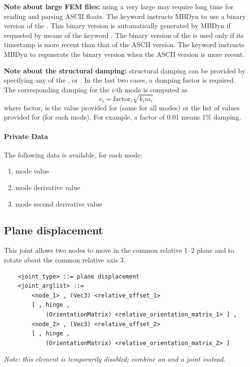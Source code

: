 \noindent
\textbf{Note about large FEM files:}
using a very large  may require long time for
reading and parsing ASCII floats.
The keyword  instructs MBDyn to use a binary version
of the .
This binary version is automatically generated by MBDyn if requested
by means of the keyword .
The binary version of the  is used only if its
timestamp is more recent than that of the ASCII version.
The keyword  instructs MBDyn to regenerate the
binary version when the ASCII version is more recent.

\noindent
\textbf{Note about the structural damping:}
structural damping can be provided by specifying any of the
,  or .
In the last two cases, a damping factor is required.
The corresponding damping for the $i$-th mode is computed as
\begin{displaymath}
	c_i = \mathrm{factor}_i \sqrt{k_i m_i}
\end{displaymath}
where $\mathrm{factor}_i$ is the value provided
for  (same for all modes) or the list 
of values provided for  (for each mode).
For example, a factor of 0.01 means 1\% damping.

\paragraph{Private Data}
The following data is available, for each mode:
\begin{enumerate}
\item {} mode  value
\item {} mode  derivative value
\item {} mode  second derivative value
\end{enumerate}




\subsection{Plane displacement}\label{sec:EL:STRUCT:JOINT:PLANE_DISPLACEMENT}
This joint allows two nodes to move in the common relative 1--2 plane 
and to rotate about the common relative axis 3.
\begin{verbatim}
    <joint_type> ::= plane displacement
    <joint_arglist> ::= 
        <node_1> , (Vec3) <relative_offset_1> 
        [ , hinge , 
            (OrientationMatrix) <relative_orientation_matrix_1> ] ,
        <node_2> , (Vec3) <relative_offset_2>
        [ , hinge , 
            (OrientationMatrix) <relative_orientation_matrix_2> ]
\end{verbatim}
\emph{Note: this element is temporarily disabled;
combine an  and a  joint instead.}

